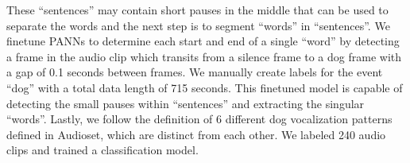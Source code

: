 These ``sentences'' may contain short pauses in the middle that can be used to separate the words and the next step is to segment ``words'' in ``sentences''. We finetune PANNs to determine each start and end of a single ``word'' by detecting a frame in the audio clip which transits from a silence frame to a dog frame with a gap of 0.1 seconds between frames. We manually create labels for the event ``dog'' with a total data length of 715 seconds. This finetuned model is capable of detecting the small pauses within ``sentences'' and extracting the singular ``words''. Lastly, we follow the definition of 6 different dog vocalization patterns defined in Audioset, which are distinct from each other. We labeled 240 audio clips and trained a classification model.  
%


 

